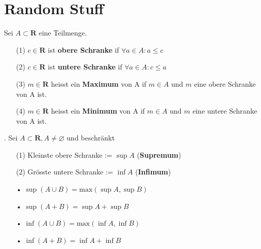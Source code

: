 \section{Random Stuff}

\Def[1.1.12]  Sei $A \subset \mathbf{R}$ eine Teilmenge.
\begin{enumerate}
\item[(1)]  $c \in \mathbf{R}$ ist \textbf{obere Schranke} if  $\forall a \in A: a \leqslant c$
\item[(2)]  $c \in \mathbf{R}$ ist \textbf{untere Schranke} if $\forall a \in A: c \leqslant a$
\item[(3)] $m \in \mathbf{R}$ heisst ein \textbf{Maximum} von A if $m \in A$ und $m$ eine obere Schranke von A ist.
\item[(4)] $m \in \mathbf{R}$ heisst ein \textbf{Minimum} von A if $m \in A$ und $m$ eine untere Schranke von A ist.
\end{enumerate}

\Satz[1.1.15]. Sei $A \subset \mathbf{R}, A \neq \varnothing$ und beschränkt
\begin{enumerate}
\item[(1)]  Kleinste obere Schranke := $\sup A$ (\textbf{Supremum})
\item[(2)]  Grösste untere Schranke := $\inf A $ (\textbf{Infimum})
\end{enumerate}

\begin{enumerate}
\item[•]  $\sup (A \cup B) = \text{max} (\sup A, \sup B)$
\item[•]  $\sup (A + B) = \sup A + \sup B$
\item[•]  $\inf (A \cup B) = \text{max} (\inf A, \inf B)$
\item[•]  $\inf (A + B) = \inf A + \inf B$
\end{enumerate}